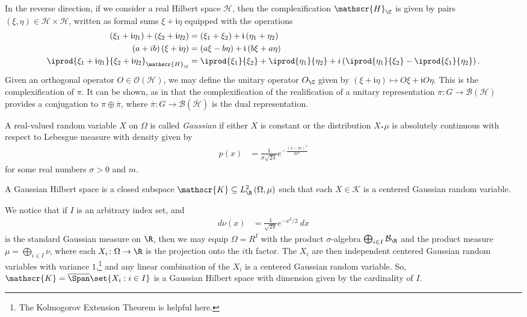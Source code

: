 \documentclass[10pt]{mypackage}
\begin{document}
In the reverse direction, if we consider a real Hilbert space $\mathscr{H}$, then the complexification $\mathscr{H}_{\C}$ is given by pairs $\left( \xi,\eta \right)\in \mathscr{H}\times \mathscr{H}$, written as formal sums $\xi + \mathfrak{i}\eta$ equipped with the operations
\begin{align*}
  \left( \xi_1 + \mathfrak{i}\eta_1 \right) + \left( \xi_2 + \mathfrak{i}\eta_2 \right) &= \left( \xi_1 + \xi_2 \right) + \mathfrak{i}\left( \eta_1 + \eta_2 \right)\\
  \left( a + ib \right)\left( \xi + \mathfrak{i}\eta \right) &= \left( a\xi - b\eta \right) + \mathfrak{i}\left( b\xi + a\eta \right)\\
  \iprod{\xi_1 + \mathfrak{i}\eta_1}{\xi_2 + \mathfrak{i}\eta_2}_{\mathscr{H}_{\C}} &= \iprod{\xi_1}{\xi_2} + \iprod{\eta_1}{\eta_2} + i \left( \iprod{\eta_1}{\xi_2} - \iprod{\xi_1}{\eta_2} \right).
\end{align*}
Given an orthogonal operator $O\in \mathcal{O}\left( \mathscr{H} \right)$, we may define the unitary operator $O_{\C}$ given by $\left( \xi + \mathfrak{i}\eta \right) \mapsto O\xi + \mathfrak{i}O\eta$. This is the complexification of $\pi$. It can be shown, as in \cite[Appendix E.1]{kerr_and_li} that the complexification of the realification of a unitary representation $\pi\colon G\to \mathcal{B}\left( \mathscr{H} \right)$ provides a conjugation to $\pi\oplus \overline{\pi}$, where $ \overline{\pi}\colon G\to \mathcal{B}\left( \overline{\mathscr{H}} \right) $ is the dual representation.
\begin{definition}
  A real-valued random variable $X$ on $\Omega$ is called \textit{Gaussian} if either $X$ is constant or the distribution $X_{\ast}\mu$ is absolutely continuous with respect to Lebesgue measure with density given by
  \begin{align*}
    p(x) &= \frac{1}{\sigma\sqrt{2\pi}}e^{-\frac{\left( x-m \right)^2}{2\sigma^2}}
  \end{align*}
  for some real numbers $\sigma > 0$ and $m$.

  A Gaussian Hilbert space is a closed subspace $ \mathscr{K}\subseteq L^2_{\R}\left( \Omega,\mu \right) $ such that each $X\in \mathscr{K}$ is a centered Gaussian random variable.
\end{definition}
We notice that if $I$ is an arbitrary index set, and
\begin{align*}
  d\nu(x) &= \frac{1}{\sqrt{2\pi}}e^{-x^2/2}\:dx
\end{align*}
is the standard Gaussian measure on $\R$, then we may equip $\Omega = R^{I}$ with the product $\sigma$-algebra $\bigoplus_{i\in I}\mathcal{B}_{\R}$ and the product measure $\mu = \bigoplus_{i\in I}\nu$, where each $X_i\colon \Omega\to \R$ is the projection onto the $i$th factor. The $X_i$ are then independent centered Gaussian random variables with variance $1$,\footnote{The Kolmogorov Extension Theorem is helpful here.} and any linear combination of the $X_i$ is a centered Gaussian random variable. So, $ \mathscr{K} = \overline{\Span}\set{X_i : i\in I} $ is a Gaussian Hilbert space with dimension given by the cardinality of $I$.
\end{document}
